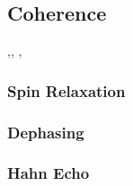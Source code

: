 \cite{Eisenach2021}

\cite{Anderson2022-sf}


\cite{Niethammer2019}


\cite{Morello2010}

\cite{PhysRevApplied.17.034046}


\subsection{Coherence}
\cite{Christle2014},\cite{Soltamov2019}, \cite{Gilardoni2020} \cite{BulanceaLindvall2021}, \cite{Astner2022}

\cite{Seo2016-ed}

\subsubsection{Spin Relaxation}
\subsubsection{Dephasing}
\subsubsection{Hahn Echo}
\cite{Wu2016}
